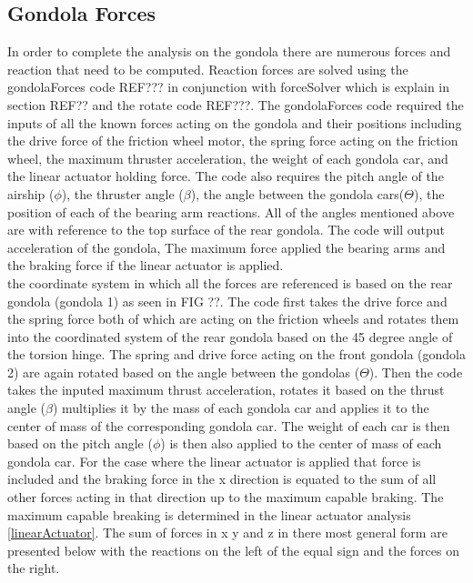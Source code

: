 \documentclass[../main.tex]{subfiles}
\begin{document}
	
\subsection{Gondola Forces} \label{gondForces}
In order to complete the analysis on the gondola there are numerous forces and reaction that need to be computed. Reaction forces are solved using the gondolaForces code REF??? in conjunction with forceSolver which is explain in section REF?? and  the rotate code REF???. The gondolaForces code required the inputs of all the known forces acting on the gondola and their positions including the drive force of the friction wheel motor, the spring force acting on the friction wheel, the maximum thruster acceleration, the weight of each gondola car, and the linear actuator holding force. The code also requires the pitch angle of the airship ($\phi$), the thruster angle ($\beta$), the angle between the gondola cars($\Theta$), the position of each of the bearing arm reactions. All of the angles mentioned above are with reference to the top surface of the rear gondola. The code will output acceleration of the gondola, The maximum force applied the bearing arms and the braking force if the linear actuator is applied. \\

the coordinate system in which all the forces are referenced is based on the rear gondola (gondola 1) as seen in FIG ??. The code first takes the drive force and the spring force both of which are acting on the friction wheels and rotates them into the coordinated system of the rear gondola based on the 45 degree angle of the torsion hinge. The spring and drive force acting on the front gondola (gondola 2) are again rotated based on the angle between the gondolas ($\Theta$). Then the code takes the inputed maximum thrust acceleration, rotates it based on the thrust angle ($\beta$) multiplies it by the mass of each gondola car and applies it to the center of mass of the corresponding gondola car. The weight of each car is then based on the pitch angle ($\phi$) is then also applied to the center of mass of each gondola car. For the case where the linear actuator is applied that force is included and the braking force in the x direction is equated to the sum of all other forces acting in that direction up to the maximum capable braking. The maximum capable breaking is determined in the linear actuator analysis \ref{linearActuator}. The sum of forces in x y and z in there most general form are presented below with the reactions on the left of the equal sign and the forces on the right.
\end{document}
